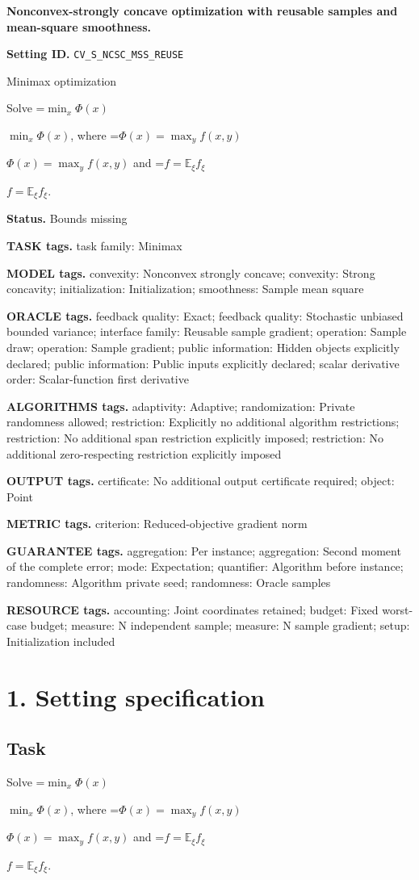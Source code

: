 \documentclass[10pt,a4paper]{article}
\newcommand{\AtlasMath}[1]{\par\begingroup\centering\setbox0=\hbox{$\displaystyle #1$}\ifdim\wd0>1.4\linewidth\typeout{ATLAS WIDE FORMULA: \the\wd0}\fi\ifdim\wd0>\linewidth\resizebox{\linewidth}{!}{\box0}\else\box0\fi\par\endgroup}
\newcommand{\AtlasInlineMath}[1]{\begingroup\setbox0=\hbox{$#1$}\ifdim\wd0>.4\linewidth\endgroup\AtlasMath{#1}\else\endgroup$#1$\fi}
\begin{document}
\raggedright

{\LARGE\bfseries\sffamily\color{AtlasNavy} Nonconvex-strongly concave optimization with reusable samples and mean-square smoothness.\par}\vspace{5pt}
\textbf{Setting ID.} \texttt{CV\_\allowbreak{}S\_\allowbreak{}NCSC\_\allowbreak{}MSS\_\allowbreak{}REUSE}

Minimax optimization

Solve \AtlasInlineMath{\min_x\Phi(x)}, where \AtlasInlineMath{\Phi(x)=\max_y f(x,y)} and \AtlasInlineMath{f=\mathbb E_\xi f_\xi}.

\textbf{Status.} Bounds missing

\textbf{TASK tags.} task family: Minimax

\textbf{MODEL tags.} convexity: Nonconvex strongly concave; convexity: Strong concavity; initialization: Initialization; smoothness: Sample mean square

\textbf{ORACLE tags.} feedback quality: Exact; feedback quality: Stochastic unbiased bounded variance; interface family: Reusable sample gradient; operation: Sample draw; operation: Sample gradient; public information: Hidden objects explicitly declared; public information: Public inputs explicitly declared; scalar derivative order: Scalar-function first derivative

\textbf{ALGORITHMS tags.} adaptivity: Adaptive; randomization: Private randomness allowed; restriction: Explicitly no additional algorithm restrictions; restriction: No additional span restriction explicitly imposed; restriction: No additional zero-respecting restriction explicitly imposed

\textbf{OUTPUT tags.} certificate: No additional output certificate required; object: Point

\textbf{METRIC tags.} criterion: Reduced-objective gradient norm

\textbf{GUARANTEE tags.} aggregation: Per instance; aggregation: Second moment of the complete error; mode: Expectation; quantifier: Algorithm before instance; randomness: Algorithm private seed; randomness: Oracle samples

\textbf{RESOURCE tags.} accounting: Joint coordinates retained; budget: Fixed worst-case budget; measure: N independent sample; measure: N sample gradient; setup: Initialization included

\section{1. Setting specification}
\subsection{Task}
Solve \AtlasInlineMath{\min_x\Phi(x)}, where \AtlasInlineMath{\Phi(x)=\max_y f(x,y)} and \AtlasInlineMath{f=\mathbb E_\xi f_\xi}.
\end{document}
